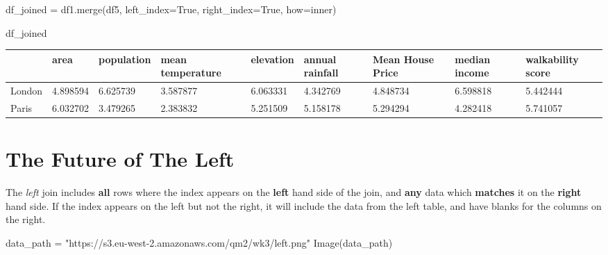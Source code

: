 \documentclass[
  letterpaper,
  DIV=11,
  numbers=noendperiod]{scrreprt}
\newenvironment{Shaded}{\begin{snugshade}}{\end{snugshade}}
\newcommand{\NormalTok}[1]{\textcolor[rgb]{0.00,0.23,0.31}{#1}}
\newcommand{\OperatorTok}[1]{\textcolor[rgb]{0.37,0.37,0.37}{#1}}
\newcommand{\StringTok}[1]{\textcolor[rgb]{0.13,0.47,0.30}{#1}}
\newcommand{\VariableTok}[1]{\textcolor[rgb]{0.07,0.07,0.07}{#1}}
\begin{document}
\begin{Shaded}
\begin{Highlighting}[]
\NormalTok{df\_joined }\OperatorTok{=}\NormalTok{ df1.merge(df5, left\_index}\OperatorTok{=}\VariableTok{True}\NormalTok{, right\_index}\OperatorTok{=}\VariableTok{True}\NormalTok{, how}\OperatorTok{=}\StringTok{\textquotesingle{}inner\textquotesingle{}}\NormalTok{)}
\end{Highlighting}
\end{Shaded}

\begin{Shaded}
\begin{Highlighting}[]
\NormalTok{df\_joined}
\end{Highlighting}
\end{Shaded}

\begin{longtable}[]{@{}lllllllll@{}}
\toprule\noalign{}
& area & population & mean temperature & elevation & annual rainfall &
Mean House Price & median income & walkability score \\
\midrule\noalign{}
\endhead
\bottomrule\noalign{}
\endlastfoot
London & 4.898594 & 6.625739 & 3.587877 & 6.063331 & 4.342769 & 4.848734
& 6.598818 & 5.442444 \\
Paris & 6.032702 & 3.479265 & 2.383832 & 5.251509 & 5.158178 & 5.294294
& 4.282418 & 5.741057 \\
\end{longtable}

\hypertarget{the-future-of-the-left}{%
\section{The Future of The Left}\label{the-future-of-the-left}}

The \emph{left} join includes \textbf{all} rows where the index appears
on the \textbf{left} hand side of the join, and \textbf{any} data which
\textbf{matches} it on the \textbf{right} hand side. If the index
appears on the left but not the right, it will include the data from the
left table, and have blanks for the columns on the right.

\begin{Shaded}
\begin{Highlighting}[]
\NormalTok{data\_path }\OperatorTok{=} \StringTok{"https://s3.eu{-}west{-}2.amazonaws.com/qm2/wk3/left.png"}
\NormalTok{Image(data\_path)}
\end{Highlighting}
\end{Shaded}
\end{document}
